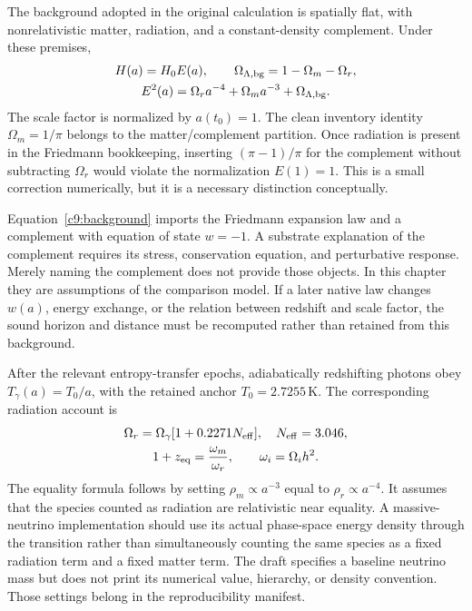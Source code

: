 The background adopted in the original calculation is spatially flat, with nonrelativistic matter, radiation, and a constant-density complement. Under these premises,
\begin{equation}
 \begin{gathered}
 H(a)=H_0 E(a),\qquad \Omega_{\Lambda,{\rm bg}}=1-\Omega_m-\Omega_r,\\
 E^2(a)=\Omega_r a^{-4}+\Omega_m a^{-3}+\Omega_{\Lambda,{\rm bg}}.
 \end{gathered}
\label{c9:background}
\end{equation}
The scale factor is normalized by $a(t_0)=1$. The clean inventory identity $\Omega_m=1/\pi$ belongs to the matter/complement partition. Once radiation is present in the Friedmann bookkeeping, inserting $(\pi-1)/\pi$ for the complement without subtracting $\Omega_r$ would violate the normalization $E(1)=1$. This is a small correction numerically, but it is a necessary distinction conceptually.

Equation~\eqref{c9:background} imports the Friedmann expansion law and a complement with equation of state $w=-1$. A substrate explanation of the complement requires its stress, conservation equation, and perturbative response. Merely naming the complement does not provide those objects. In this chapter they are assumptions of the comparison model. If a later native law changes $w(a)$, energy exchange, or the relation between redshift and scale factor, the sound horizon and distance must be recomputed rather than retained from this background.

After the relevant entropy-transfer epochs, adiabatically redshifting photons obey $T_\gamma(a)=T_0/a$, with the retained anchor $T_0=2.7255\,\mathrm K$. The corresponding radiation account is
\begin{equation}
 \begin{gathered}
 \Omega_r=\Omega_\gamma[1+0.2271N_{\rm eff}],\quad N_{\rm eff}=3.046,\\
 1+z_{\rm eq}=\frac{\omega_m}{\omega_r},\qquad \omega_i=\Omega_i h^2.
 \end{gathered}
\label{c9:radiation}
\end{equation}
The equality formula follows by setting $\rho_m\propto a^{-3}$ equal to $\rho_r\propto a^{-4}$. It assumes that the species counted as radiation are relativistic near equality. A massive-neutrino implementation should use its actual phase-space energy density through the transition rather than simultaneously counting the same species as a fixed radiation term and a fixed matter term. The draft specifies a baseline neutrino mass but does not print its numerical value, hierarchy, or density convention. Those settings belong in the reproducibility manifest.

